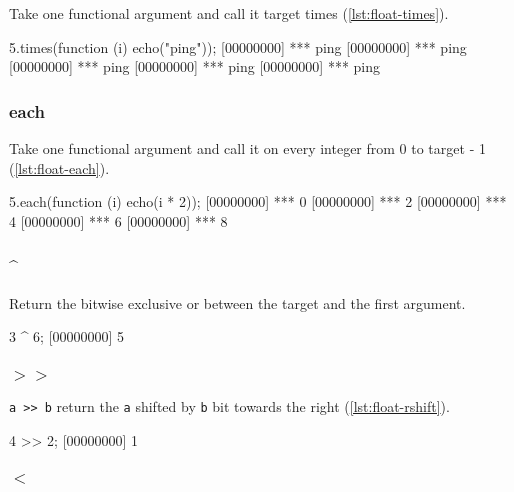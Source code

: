 Take one functional argument and call it target times (\autoref{lst:float-times}).

\begin{urbiscript}[caption=Float.times, label=lst:float-times,
  float=\floatposh]
  5.times(function (i) { echo("ping")});
  [00000000] *** ping
  [00000000] *** ping
  [00000000] *** ping
  [00000000] *** ping
  [00000000] *** ping
\end{urbiscript}

\subsubsection{each}

Take one functional argument and call it on every integer from 0 to
target - 1 (\autoref{lst:float-each}).

\begin{urbiscript}[caption=Float.each, label=lst:float-each,
  float=\floatposh]
  5.each(function (i) { echo(i * 2)});
  [00000000] *** 0
  [00000000] *** 2
  [00000000] *** 4
  [00000000] *** 6
  [00000000] *** 8
\end{urbiscript}

\subsubsection{\^{}}

Return the bitwise exclusive or between the target and the first argument.

\begin{urbiscript}[caption=Float.'\^{}', label=lst:float-bitxor,
  float=\floatposh]
  3 ^ 6;
  [00000000] 5
\end{urbiscript}

\subsubsection{$>>$}

\lstinline|a >> b| return the \lstinline|a| shifted by \lstinline|b|
bit towards the right (\autoref{lst:float-rshift}).

\begin{urbiscript}[caption=Float.'$>>$', label=lst:float-rshift,
  float=\floatposh]
  4 >> 2;
  [00000000] 1
\end{urbiscript}

\subsubsection{$<$}

